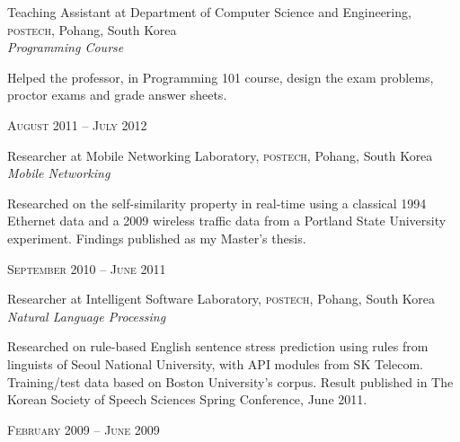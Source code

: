 \documentclass[10pt]{article} %
\begin{document}
{\begin{minipage}[t]{0.5\textwidth}
{\raggedright\large Teaching Assistant at Department of Computer Science and Engineering, \textsc{postech}, Pohang, South Korea\\
\textit{Programming Course}\\[5pt]}

\normalsize{Helped the professor, in Programming 101 course, design the exam problems, proctor exams and grade answer sheets.}\\


{\raggedleft\textsc{August 2011 -- July 2012}\par}

{\raggedright\large Researcher at Mobile Networking Laboratory, \textsc{postech}, Pohang, South Korea\\
\textit{Mobile Networking}\\[5pt]}

\normalsize{Researched on the self-similarity property in real-time using a classical 1994 Ethernet data and a 2009 wireless traffic data from a Portland State University experiment. Findings published as my Master's thesis.}\\


{\raggedleft\textsc{September 2010 -- June 2011}\par}

{\raggedright\large Researcher at Intelligent Software Laboratory, \textsc{postech}, Pohang, South Korea\\
\textit{Natural Language Processing}\\[5pt]}

\normalsize{Researched on rule-based English sentence stress prediction using rules from linguists of Seoul National University, with API modules from SK Telecom. Training/test data based on Boston University's corpus. Result published in The Korean Society of Speech Sciences Spring Conference, June 2011.}\\


{\raggedleft\textsc{February 2009 -- June 2009}\par}


\end{minipage}}
\end{document}
